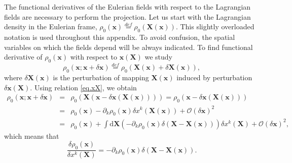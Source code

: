 \documentclass[
10pt, %
a4paper, %
oneside, %
headinclude,footinclude, %
BCOR5mm, %
]{scrartcl}
\newcommand{\xx}{\mathbf{x}}
\newcommand{\XX}{\mathbf{X}}
\newcommand{\dX}{\mathrm{d}\XX}
\newcommand{\OBig}{\mathcal{O}}
\begin{document}
The functional derivatives of the Eulerian fields with respect to the Lagrangian fields are necessary to perform the projection. Let us start with the Lagrangian density in the Eulerian frame, $\rho_0(\xx)\stackrel{def}{=}\rho_0(\XX(\xx))$. This slightly overloaded notation is used throughout this appendix. To avoid confusion, the spatial variables on which the fields depend will be always indicated. To find functional derivative of $\rho_0(\xx)$ with respect to $\xx(\XX)$ we study 
\begin{equation}
	\rho_0(\xx;\xx+\delta\xx)\stackrel{def}{=} \rho_0(\XX(\xx)+\delta\XX(\xx)),
\end{equation}
where $\delta\XX(\xx)$ is the perturbation of mapping $\XX(\xx)$ induced by perturbation $\delta\xx(\XX)$. Using relation \eqref{eq.xX}, we obtain 
\begin{eqnarray}
	\rho_0(\xx;\xx+\delta\xx) &=& \rho_0(\XX(\xx-\delta\xx(\XX(\xx)))) = \rho_0(\xx-\delta\xx(\XX(\xx)))\nonumber\\
	&=&\rho_0(\xx)-\partial_k \rho_0(\xx) \delta x^k(\XX(\xx))+\OBig(\delta\xx)^2\nonumber\\
	&=&\rho_0(\xx)+\int\dX \left(-\partial_k \rho_0(\xx) \delta(\XX-\XX(\xx))\right)\delta x^k(\XX)+\OBig(\delta\xx)^2,
\end{eqnarray}
which means that
\begin{equation}\label{eq.rho0x}
	\frac{\delta \rho_0(\xx)}{\delta x^k(\XX)} = -\partial_k \rho_0(\xx) \delta(\XX-\XX(\xx)).
\end{equation}
\end{document}
